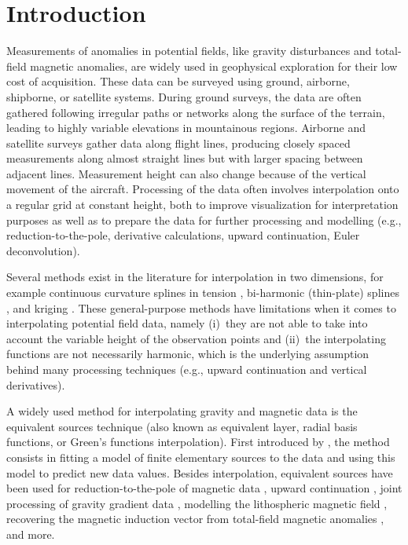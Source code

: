 \section{Introduction}

Measurements of anomalies in potential fields, like gravity disturbances and
total-field magnetic anomalies, are widely used in geophysical exploration for
their low cost of acquisition.
These data can be surveyed using ground, airborne, shipborne, or satellite
systems.
During ground surveys, the data are often gathered following irregular paths or
networks along the surface of the terrain, leading to highly variable
elevations in mountainous regions.
Airborne and satellite surveys gather data along flight lines, producing
closely spaced measurements along almost straight lines but with larger spacing
between adjacent lines.
Measurement height can also change because of the vertical movement of the
aircraft.
Processing of the data often involves interpolation onto a regular grid at
constant height, both to improve visualization for interpretation purposes as
well as to prepare the data for further processing and modelling (e.g.,
reduction-to-the-pole, derivative calculations, upward continuation, Euler
deconvolution).

Several methods exist in the literature for interpolation in two dimensions,
for example continuous curvature splines in tension \citep{smith1990},
bi-harmonic (thin-plate) splines \citep{sandwell1987}, and kriging
\citep{hansen1993}.
These general-purpose methods have limitations when it comes to interpolating
potential field data, namely
(i)~they are not able to take into account the variable height of the
observation points and
(ii)~the interpolating functions are not necessarily harmonic, which
is the underlying assumption behind many processing techniques
(e.g., upward continuation and vertical derivatives).

A widely used method for interpolating gravity and magnetic data
is the equivalent sources technique (also known as equivalent layer, radial
basis functions, or Green's functions interpolation).
First introduced by \citet{dampney1969}, the method consists in fitting a model
of finite elementary sources to the data and using this model to predict new
data values.
Besides interpolation, equivalent sources have been used for
reduction-to-the-pole of magnetic data
\citep{silva1986, nakatsuka2006, guspi2009}, upward
continuation \citep{emilia1973, li2010}, joint processing of gravity gradient
data \citep{barnes2011}, modelling the lithospheric magnetic field
\citep{kother2015}, recovering the magnetic induction vector from
total-field magnetic anomalies \citep{li2020}, and more.

